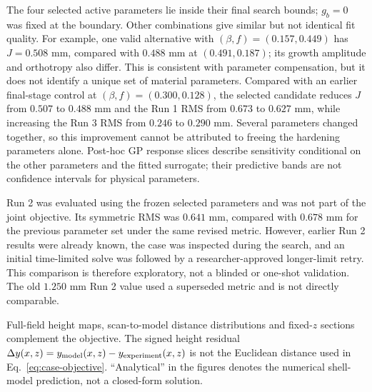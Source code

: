 \documentclass[11pt]{article}
\begin{document}
The four selected active parameters lie inside their final search bounds; $g_b=0$ was fixed at the boundary. Other combinations give similar but not identical fit quality. For example, one valid alternative with $(\beta,f)=(0.157,0.449)$ has $J=0.508$ mm, compared with $0.488$ mm at $(0.491,0.187)$; its growth amplitude and orthotropy also differ. This is consistent with parameter compensation, but it does not identify a unique set of material parameters. Compared with an earlier final-stage control at $(\beta,f)=(0.300,0.128)$, the selected candidate reduces $J$ from $0.507$ to $0.488$ mm and the Run 1 RMS from $0.673$ to $0.627$ mm, while increasing the Run 3 RMS from $0.246$ to $0.290$ mm. Several parameters changed together, so this improvement cannot be attributed to freeing the hardening parameters alone. Post-hoc GP response slices describe sensitivity conditional on the other parameters and the fitted surrogate; their predictive bands are not confidence intervals for physical parameters.

Run 2 was evaluated using the frozen selected parameters and was not part of the joint objective. Its symmetric RMS was $0.641$ mm, compared with $0.678$ mm for the previous parameter set under the same revised metric. However, earlier Run 2 results were already known, the case was inspected during the search, and an initial time-limited solve was followed by a researcher-approved longer-limit retry. This comparison is therefore exploratory, not a blinded or one-shot validation. The old $1.250$ mm Run 2 value used a superseded metric and is not directly comparable.

Full-field height maps, scan-to-model distance distributions and fixed-$z$ sections complement the objective. The signed height residual $\Delta y(x,z)=y_{\rm model}(x,z)-y_{\rm experiment}(x,z)$ is not the Euclidean distance used in Eq.~\eqref{eq:case-objective}. ``Analytical'' in the figures denotes the numerical shell-model prediction, not a closed-form solution.
\end{document}
